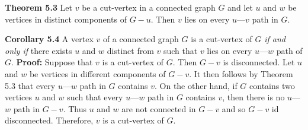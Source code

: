 \nopagenumbers
{\bf Theorem 5.3}
\vskip 6pt
Let $v$ be a cut-vertex in a connected graph $G$ and let $u$ and $w$ be vertices in distinct components of $G-u$. Then $v$ lies on every $u$---$v$ path in $G$.

\vskip 10pt
{\bf Corollary 5.4}
\vskip 6pt
A vertex $v$ of a connected graph $G$ is a cut-vertex of $G$ {\it if and only if} there exists $u$ and $w$ distinct from $v$ such that $v$ lies on every $u$---$w$ path of $G$.
\vskip 10pt
{\bf Proof:}
\vskip 6pt
Suppose that $v$ is a cut-vertex of $G$. Then $G-v$ is disconnected. Let $u$ and $w$ be vertices in different components of $G-v$. It then follows by Theorem 5.3 that every $u$---$w$ path in $G$ contains $v$.
\vskip 1mm
On the other hand, if $G$ contains two vertices $u$ and $w$ such that every $u$---$w$ path in $G$ contains $v$, then there is no $u$---$w$ path in $G-v$. Thus $u$ and $w$ are not connected in $G-v$ and so $G-v$ id disconnected. Therefore, $v$ is a cut-vertex of $G$.

\vfill\eject
